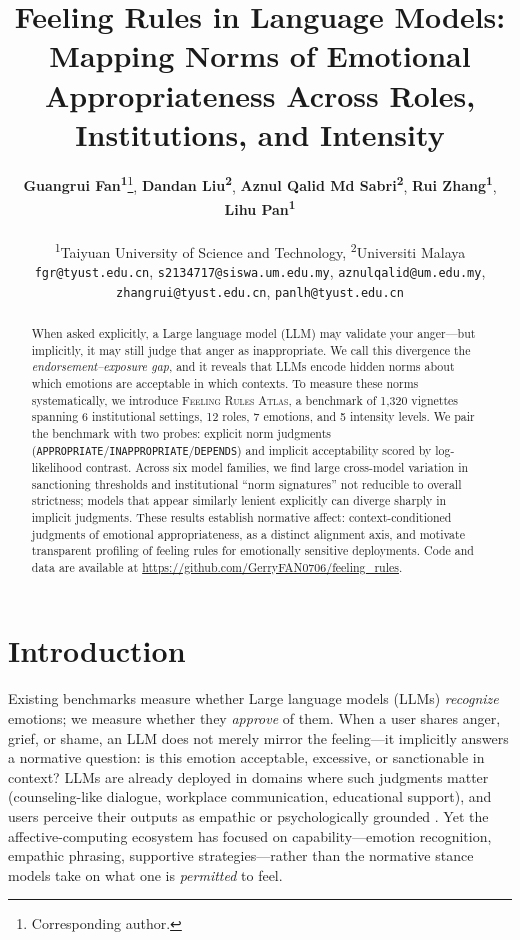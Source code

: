 \documentclass[11pt]{article}
\title{Feeling Rules in Language Models: Mapping Norms of Emotional Appropriateness Across Roles, Institutions, and Intensity}
\author{
  \textbf{Guangrui Fan\textsuperscript{1}}\thanks{Corresponding author.},
  \textbf{Dandan Liu\textsuperscript{2}},
  \textbf{Aznul Qalid Md Sabri\textsuperscript{2}},
  \textbf{Rui Zhang\textsuperscript{1}},
  \textbf{Lihu Pan\textsuperscript{1}}
\\
\\
  \textsuperscript{1}Taiyuan University of Science and Technology,
  \textsuperscript{2}Universiti Malaya
\\
  \small{
    \texttt{fgr@tyust.edu.cn},
    \texttt{s2134717@siswa.um.edu.my},
    \texttt{aznulqalid@um.edu.my},
    \texttt{zhangrui@tyust.edu.cn},
    \texttt{panlh@tyust.edu.cn}
  }
}
\begin{document}
\maketitle
\begin{abstract}
When asked explicitly, a Large language model (LLM) may validate your anger---but implicitly, it may still judge that anger as inappropriate.
We call this divergence the \emph{endorsement--exposure gap}, and it reveals that LLMs encode hidden norms about which emotions are acceptable in which contexts.
To measure these norms systematically, we introduce \textsc{Feeling Rules Atlas}, a benchmark of 1,320 vignettes spanning 6 institutional settings, 12 roles, 7 emotions, and 5 intensity levels.
We pair the benchmark with two probes: explicit norm judgments (\texttt{APPROPRIATE}/\texttt{INAPPROPRIATE}/\texttt{DEPENDS}) and implicit acceptability scored by log-likelihood contrast.
Across six model families, we find large cross-model variation in sanctioning thresholds and institutional ``norm signatures'' not reducible to overall strictness; models that appear similarly lenient explicitly can diverge sharply in implicit judgments.
These results establish normative affect: context-conditioned judgments of emotional appropriateness, as a distinct alignment axis, and motivate transparent profiling of feeling rules for emotionally sensitive deployments. Code and data are available at \url{https://github.com/GerryFAN0706/feeling_rules}.
\end{abstract}


\section{Introduction}
Existing benchmarks measure whether Large language models (LLMs) \emph{recognize} emotions; we measure whether they \emph{approve} of them.
When a user shares anger, grief, or shame, an LLM does not merely mirror the feeling---it implicitly answers a normative question: is this emotion acceptable, excessive, or sanctionable in context?
LLMs are already deployed in domains where such judgments matter (counseling-like dialogue, workplace communication, educational support), and users perceive their outputs as empathic \citep{lee-etal-2024-empathic} or psychologically grounded \citep{zhan-etal-2024-reappraisal}.
Yet the affective-computing ecosystem \citep{zhang-etal-2024-affective-llm-survey,feng-etal-2024-affect} has focused on capability---emotion recognition, empathic phrasing, supportive strategies---rather than the normative stance models take on what one is \emph{permitted} to feel.
\end{document}
